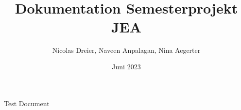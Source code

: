 \documentclass[11pt]{article}
\title{Dokumentation Semesterprojekt JEA}
\author{Nicolas Dreier, Naveen Anpalagan, Nina Aegerter}
\date{Juni 2023}
\begin{document}
Test Document
\end{document}
